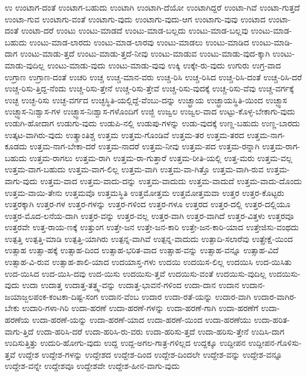 {ಉ
ಉಂಟಾಗ-ದಂತೆ
ಉಂಟಾಗ-ಬಹುದು
ಉಂಟಾಗಿ
ಉಂಟಾಗಿ-ದೆಯೋ
ಉಂಟಾಗಿದ್ದರೆ
ಉಂಟಾ-ಗಿವೆ
ಉಂಟಾ-ಗುತ್ತದೆ
ಉಂಟಾ-ಗುವ
ಉಂಟಾಗು-ವಂತೆ
ಉಂಟಾಗು-ವುದು
ಉಂಟಾಗು-ವುದು-ಆಗ
ಉಂಟಾಗು-ವುವು
ಉಂಟಾದ
ಉಂಟಾ-ದಂತೆ
ಉಂಟಾ-ದರೆ
ಉಂಟು
ಉಂಟು-ಮಾಡದೆ
ಉಂಟು-ಮಾಡ-ಬಲ್ಲದು
ಉಂಟು-ಮಾಡ-ಬಲ್ಲವು
ಉಂಟು-ಮಾಡ-ಬಹುದು
ಉಂಟು-ಮಾಡ-ಲಾರದು
ಉಂಟು-ಮಾಡ-ಲಾರವು
ಉಂಟು-ಮಾಡಲು
ಉಂಟು-ಮಾಡಿದ
ಉಂಟು-ಮಾಡಿ-ದಾಗ
ಉಂಟು-ಮಾಡು-ತ್ತದೆ
ಉಂಟು-ಮಾಡು-ತ್ತದೆ-ನೀವು
ಉಂಟು-ಮಾಡುವ
ಉಂಟು-ಮಾಡು-ವುದ-ಕ್ಕಾಗಿ
ಉಂಟು-ಮಾಡು-ವುದಿಲ್ಲ
ಉಂಟು-ಮಾಡು-ವುದು
ಉಂಟು-ಮಾಡು-ವುವು
ಉಕ್ಕಿ
ಉಕ್ಕೇ-ರು-ವುದು
ಉಗುರು
ಉಗ್ರ-ವಾದ
ಉಗ್ರಾಣ
ಉಗ್ರಾಣ-ದಂತೆ
ಉಚರಿ
ಉಚ್ಚ
ಉಚ್ಚ-ಮಾನ-ವರು
ಉಚ್ಚ-ರಿಸಿ
ಉಚ್ಚ-ರಿಸಿದ
ಉಚ್ಚ-ರಿಸಿ-ದಂತೆ
ಉಚ್ಚ-ರಿಸಿ-ದರೆ
ಉಚ್ಚ-ರಿಸು-ತ್ತಿದ್ದ-ನೆಂದು
ಉಚ್ಚ-ರಿಸು-ತ್ತೇನೆ
ಉಚ್ಚ-ರಿಸು-ತ್ತೇವೆ
ಉಚ್ಚ-ರಿಸು-ವುದಕ್ಕೆ
ಉಚ್ಚ-ರಿಸು-ವೆವು
ಉಚ್ಚ-ವರ್ಗಕ್ಕೆ
ಉಚ್ಛ
ಉಚ್ಛ-ರಿಸು
ಉಚ್ಛ-ವರ್ಗದ
ಉಚ್ಛಸ್ಥಿತಿ-ಯಲ್ಲಿದ್ದೆ-ವೆಂಬು-ದನ್ನು
ಉಚ್ಛ್ರಾಯ
ಉಚ್ಛ್ರಾಯಸ್ಥಿತಿ-ಯಿಂದ
ಉಚ್ಛ್ವಾಸ
ಉಚ್ಛ್ವಾಸ-ನಿಃಶ್ವಾಸ-ಗಳ
ಉಚ್ಛ್ವಾಸ-ನಿಃಶ್ವಾಸ-ಗಳೊಂದಿಗೆ
ಉಜ್ಜಿ
ಉಜ್ವಲ
ಉಜ್ವಲ-ವಾದ
ಉಟ್ಟು-ಕೊಳ್ಳ-ಬೇಕಾಗು-ವುದು
ಉಡುಗಿ-ಹೋದಾಗ
ಉಡುಗು-ವುದು
ಉಡುಪಿ-ನಲ್ಲಿ
ಉಡುಪು-ಗಳನ್ನು
ಉಡು-ವುದಕ್ಕೆ
ಉಣ್ಣ-ಬಹುದು
ಉಣ್ಣ-ಬಾರದು
ಉತ್ಕಟ-ವಾಗಿರು-ವುದು
ಉತ್ಕ್ರಾಂತಿಶ್ಚ
ಉತ್ತಮ
ಉತ್ತಮ-ಗೊಂಡಿವೆ
ಉತ್ತಮ-ತರ
ಉತ್ತಮ-ತರದ
ಉತ್ತಮ-ನಾಗ-ಕೂಡದು
ಉತ್ತಮ-ನಾಗ-ಬೇಕಾ-ದರೆ
ಉತ್ತಮ-ನಾದರೆ
ಉತ್ತಮ-ನೀವು
ಉತ್ತಮ-ಪದ
ಉತ್ತಮ-ರನ್ನಾಗಿ
ಉತ್ತಮ-ರಾಗ-ಬಹುದು
ಉತ್ತಮ-ರಾಗಲು
ಉತ್ತಮ-ರಾಗಿ
ಉತ್ತಮ-ರಾ-ಗುತ್ತಾರೆ
ಉತ್ತಮ-ರೀತಿ-ಯಲ್ಲಿ
ಉತ್ತ-ಮರು
ಉತ್ತಮ-ವಲ್ಲ
ಉತ್ತಮ-ವಾಗ-ಬಹುದು
ಉತ್ತಮ-ವಾಗ-ಲಿಲ್ಲ
ಉತ್ತಮ-ವಾಗಿ
ಉತ್ತಮ-ವಾ-ಗಿತ್ತೊ
ಉತ್ತಮ-ವಾಗಿ-ರುವ
ಉತ್ತಮ-ವಾಗು-ವುದು
ಉತ್ತಮ-ವಾದ
ಉತ್ತಮ-ವಾದು-ದನ್ನು
ಉತ್ತಮ-ವಾದುದು
ಉತ್ತಮ-ವಾದುದೆ
ಉತ್ತಮ-ವಾದು-ದೊಂದು
ಉತ್ತಮ-ವಾಯಿ-ತೇನು
ಉತ್ತಮವೊ
ಉತ್ತಮಸ್ಥಿತಿ
ಉತ್ತಮೋತ್ತಮ
ಉತ್ತಮೋತ್ತಮವಾ
ಉತ್ತರ
ಉತ್ತರ-ಕೊಟ್ಟರು
ಉತ್ತರಕ್ಕಾಗಿ
ಉತ್ತರ-ಗಳ
ಉತ್ತರ-ಗಳನ್ನು
ಉತ್ತರ-ಗಳಿಂದ
ಉತ್ತರ-ಗಳೂ
ಉತ್ತರದ
ಉತ್ತರ-ದಲ್ಲಿ
ಉತ್ತರ-ದಲ್ಲಿಯೂ
ಉತ್ತರ-ಮೊದ-ಲನೆಯ-ದಾಗಿ
ಉತ್ತರ-ವನ್ನು
ಉತ್ತರ-ವಲ್ಲ
ಉತ್ತರ-ವಾಗಿ
ಉತ್ತರ-ವಾಗಿದೆ
ಉತ್ತರ-ವಿತ್ತಳು
ಉತ್ತರವೂ
ಉತ್ತರವೇ
ಉತ್ತ-ರಾಯ-ಣಕ್ಕೆ
ಉತ್ತುಂಗ
ಉತ್ತೇ-ಜನ
ಉತ್ತೇ-ಜನ-ಕಾರಿ
ಉತ್ತೇ-ಜನ-ಕಾರಿ-ಯಾದ
ಉತ್ತೇಜಿಸು-ವಂಥದು
ಉತ್ಪತ್ತಿ
ಉತ್ಪತ್ತಿ-ಮಾಡಿ
ಉತ್ಪತ್ತಿ-ಯಾಗಿರು
ಉತ್ಪನ್ನ-ವಾಗಿವೆ
ಉತ್ಪನ್ನ-ವಾದುದು
ಉತ್ಪಾದಿ-ಸಲಾರೆವು
ಉತ್ಪ್ರೇಕ್ಷೆ-ಯಿಂದ
ಉತ್ಸಾಹ
ಉತ್ಸಾ-ಹಕ್ಕೆ
ಉತ್ಸಾಹ-ದಿಂದ
ಉತ್ಸಾಹ-ಭರಿತ-ವಾದ
ಉತ್ಸಾಹ-ವನ್ನು
ಉತ್ಸಾಹ-ವನ್ನೂ
ಉತ್ಸಾಹ-ವಿದೆ
ಉತ್ಸಾಹ-ವಿ-ರುವ
ಉತ್ಸಾಹ-ಶಾಲಿ-ಯಾದ
ಉದಯಾಸ್ತ-ಗಳು
ಉದಯಿ
ಉದಯಿಸ-ಲಿಲ್ಲ
ಉದಯಿಸಿ
ಉದ-ಯಿಸಿತು
ಉದ-ಯಿಸಿದ
ಉದ-ಯಿಸಿ-ದವು
ಉದ-ಯಿಸು
ಉದಯಿಸು-ತ್ತವೆ
ಉದಯಿಸು-ವಂತೆ
ಉದಯಿಸು-ವುದಿಲ್ಲ
ಉದಯಿಸು-ವುದು
ಉದಾ
ಉದಾತ್ತ
ಉದಾತ್ತ-ತತ್ತ್ವ-ವನ್ನು
ಉದಾತ್ತ-ಭಾವನೆ-ಗಳಿಂದ
ಉದಾ-ದಾನ
ಉದಾನ
ಉದಾನ-ಜಯಾಜ್ಜಲಪಂಕ-ಕಂಟಕಾ-ದಿಷ್ಟ-ಸಂಗ
ಉದಾನ-ವೆಂಬ
ಉದಾರ
ಉದಾ-ರತೆ-ಯನ್ನು
ಉದಾರ-ವಾಗಿ
ಉದಾರ-ವಾಗಿರ-ಬೇಕು
ಉದಾರಿ-ಗಳಾ-ಗಿರಿ
ಉದಾ-ಹರಣೆ
ಉದಾ-ಹರಣೆ-ಗಳನ್ನು
ಉದಾ-ಹರಣೆ-ಗಾಗಿ
ಉದಾ-ಹರಣೆಗೆ
ಉದಾ-ಹರಣೆಯ
ಉದಾ-ಹರಣೆ-ಯನ್ನು
ಉದಾ-ಹರಣೆ-ಯಾದ
ಉದಾ-ಹರಣೆ-ಯಿಂದ
ಉದಾ-ಹರಣೆಯು
ಉದಾ-ಹರಿತ-ವಾಗು-ತ್ತಿದೆ
ಉದಾ-ಹರಿಸಿ-ದರೆ
ಉದಾ-ಹರಿಸಿ-ರು-ವರು
ಉದಾ-ಹರಿಸು-ತ್ತದೆ
ಉದಾ-ಹರಿಸು-ತ್ತೇನೆ
ಉದಿಸಿ-ದಾಗ
ಉದಿಸುತ್ತಿತ್ತು
ಉದುರಿ-ಹೋಗು-ವುದು
ಉದ್ದ
ಉದ್ದ-ಅಗಲ-ಗಾತ್ರ-ಗಳಿಲ್ಲದ
ಉದ್ದಕ್ಕೂ
ಉದ್ದೀಪನ
ಉದ್ದೀಪನ-ಗೊಳಿಸು-ತ್ತವೆ
ಉದ್ದೇಶ
ಉದ್ದೇಶ-ಗಳನ್ನು
ಉದ್ದೇಶದ
ಉದ್ದೇಶ-ದಿಂದ
ಉದ್ದೇಶ-ದಿಂದಲೇ
ಉದ್ದೇಶ-ವನ್ನು
ಉದ್ದೇಶ-ವನ್ನೂ
ಉದ್ದೇಶ-ವನ್ನೇ
ಉದ್ದೇಶವೂ
ಉದ್ದೇಶವೇ
ಉದ್ದೇಶ-ಹೀನ-ವಾಗು-ವುದು
}
